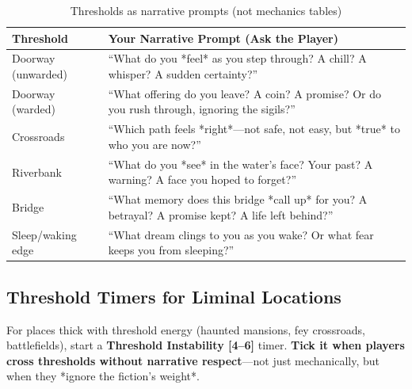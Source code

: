 \begin{table}[htbp]
\centering
\small
\begin{tabularx}{\textwidth}{lX}
\toprule
\textbf{Threshold} & \textbf{Your Narrative Prompt (Ask the Player)} \\
\midrule
Doorway (unwarded) & ``What do you *feel* as you step through? A chill? A whisper? A sudden certainty?'' \\
\midrule
Doorway (warded) & ``What offering do you leave? A coin? A promise? Or do you rush through, ignoring the sigils?'' \\
\midrule
Crossroads & ``Which path feels *right*---not safe, not easy, but *true* to who you are now?'' \\
\midrule
Riverbank & ``What do you *see* in the water's face? Your past? A warning? A face you hoped to forget?'' \\
\midrule
Bridge & ``What memory does this bridge *call up* for you? A betrayal? A promise kept? A life left behind?'' \\
\midrule
Sleep/waking edge & ``What dream clings to you as you wake? Or what fear keeps you from sleeping?'' \\
\bottomrule
\end{tabularx}
\caption{Thresholds as narrative prompts (not mechanics tables)}
\label{tab:threshold-prompts}
\end{table}

\subsection*{Threshold Timers for Liminal Locations}
For places thick with threshold energy (haunted mansions, fey crossroads, battlefields), start a \textbf{Threshold Instability [4--6]} timer. \textbf{Tick it when players cross thresholds without narrative respect}---not just mechanically, but when they *ignore the fiction's weight*.

